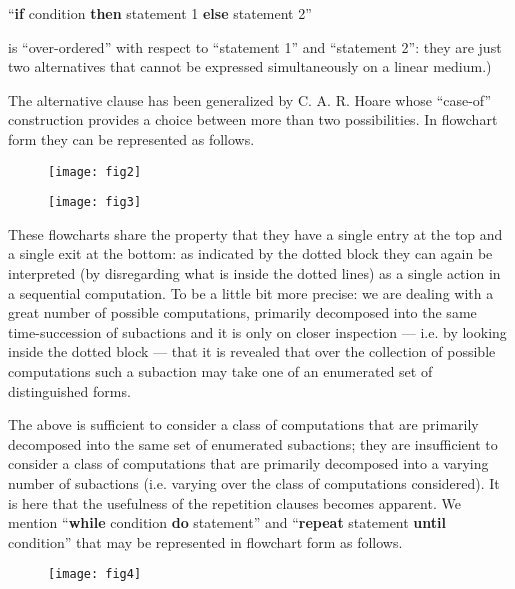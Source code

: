 {
	\setlength{\parindent}{8em}
	\hspace{-.5em}``\textbf{if} condition \textbf{then} statement 1 \textbf{else} statement 2''
}
\medskip

\noindent
is ``over-ordered'' with respect to ``statement 1'' and ``statement 2'': they are just two alternatives that cannot be expressed simultaneously on a linear medium.)

The alternative clause has been generalized by C. A. R. Hoare whose ``case-of'' construction provides a choice between more than two possibilities. In flowchart form they can be represented as follows.

\begin{figure}[ht!]
	\centering
	\texttt{[image: fig2]}
\end{figure}

\begin{figure}[ht!]
	\centering
	\texttt{[image: fig3]}
\end{figure}

These flowcharts share the property that they have a single entry at the top and a single exit at the bottom: as indicated by the dotted block they can again be interpreted (by disregarding what is inside the dotted lines) as a single action in a sequential computation. To be a little bit more precise: we are dealing with a great number of possible computations, primarily decomposed into the same time-succession of subactions and it is only on closer inspection --- i.e. by looking inside the dotted block --- that it is revealed that over the collection of possible computations such a subaction may take one of an enumerated set of distinguished forms.

The above is sufficient to consider a class of computations that are primarily decomposed into the same set of enumerated subactions; they are insufficient to consider a class of computations that are primarily decomposed into a varying number of subactions (i.e. varying over the class of computations considered). It is here that the usefulness of the repetition clauses becomes apparent. We mention ``\textbf{while} condition \textbf{do} statement'' and ``\textbf{repeat} statement \textbf{until} condition'' that may be represented in flowchart form as follows.

\begin{figure}[ht!]
	\centering
	\texttt{[image: fig4]}
\end{figure}

